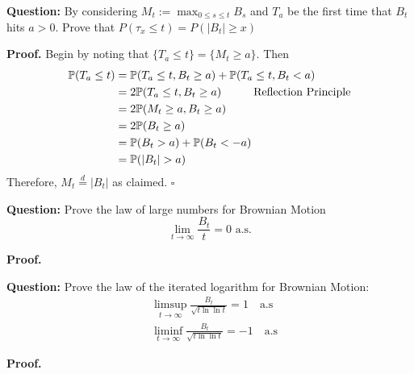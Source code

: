 \documentclass{article}
\begin{document}
\begin{tcolorbox}[colframe=black,colback=gray!5,boxrule=0.5pt]
\textbf{Question:} By considering $M_t := \max_{0\leq s \leq t} B_s$ and $T_a$ be the first time that $B_t$ hits $a > 0$. Prove that $P(\tau_x\leq t) = P(|B_t|\geq x)$  
\end{tcolorbox}
\textbf{Proof.} Begin by noting that $\{T_a\leq t\} = \{M_t\geq a\}$. Then
\begin{align*}
    \mathbb{P}(T_a\leq t) &= \mathbb{P}(T_a\leq t, B_t\geq a) + \mathbb{P}(T_a\leq t, B_t< a) \\
    &= 2\mathbb{P}(T_a\leq t, B_t\geq a) \hspace{10mm} \text{Reflection Principle} \\
    &= 2\mathbb{P}(M_t\geq a, B_t\geq a) \\
    &= 2\mathbb{P}(B_t\geq a) \\
    &= \mathbb{P}(B_t> a) + \mathbb{P}(B_t <-a) \\
    &= \mathbb{P}(|B_t| > a)
\end{align*}
Therefore, $M_t \stackrel{d}{=} |B_t|$ as claimed. $\square$

\begin{tcolorbox}[colframe=black,colback=gray!5,boxrule=0.5pt]
\textbf{Question:} Prove the law of large numbers for Brownian Motion
$$\lim_{t\to\infty}\frac{B_t}{t} = 0 \text{ a.s.}$$
\end{tcolorbox}
\textbf{Proof.}

\begin{tcolorbox}[colframe=black,colback=gray!5,boxrule=0.5pt]
\textbf{Question:} Prove the law of the iterated logarithm for Brownian Motion:
\begin{align*}
    & \limsup_{t\to\infty}\frac{B_t}{\sqrt{t\ln\ln t}}=1\quad \text{a.s} \\
    & \liminf_{t\to\infty}\frac{B_t}{\sqrt{t\ln\ln t}}=-1\quad \text{a.s}
\end{align*}
\end{tcolorbox}
\textbf{Proof.}
\end{document}

